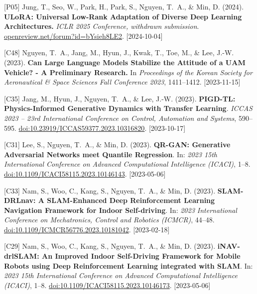 {\begin{pubenumerate}
\item {\color{blue}[P05]} Jung, T., Seo, W., Park, H., Park, S., Nguyen, T.\ A., \& Min, D. (2024). 
  \textbf{ULoRA: Universal Low-Rank Adaptation of Diverse Deep Learning Architectures.} 
  \textit{ICLR 2025 Conference, withdrawn submission}. 
  \href{https://openreview.net/forum?id=bYsieh8LE2}{openreview.net/forum?id=bYsieh8LE2}. [2024-10-04]

\item {\color{green}[C48]} Nguyen, T.\ A., Jang, M., Hyun, J., Kwak, T., Toe, M., \& Lee, J.-W. (2023). 
  \textbf{Can Large Language Models Stabilize the Attitude of a UAM Vehicle? - A Preliminary Research.} 
  In \textit{Proceedings of the Korean Society for Aeronautical \& Space Sciences Fall Conference 2023}, 1411--1412. [2023-11-15]

\item {\color{green}[C35]} Jang, M., Hyun, J., Nguyen, T.\ A., \& Lee, J.-W. (2023). \textbf{PIGD-TL: Physics-Informed Generative Dynamics with Transfer Learning}. \textit{ICCAS 2023 -- 23rd International Conference on Control, Automation and Systems}, 590--595. \href{https://doi.org/10.23919/ICCAS59377.2023.10316820}{doi:10.23919/ICCAS59377.2023.10316820}. [2023-10-17]

\item {\color{green}[C31]} Lee, S., Nguyen, T.\ A., \& Min, D. (2023). \textbf{QR-GAN: Generative Adversarial Networks meet Quantile Regression}. In: \textit{2023 15th International Conference on Advanced Computational Intelligence (ICACI)}, 1--8. \href{https://doi.org/10.1109/ICACI58115.2023.10146143}{doi:10.1109/ICACI58115.2023.10146143}. [2023-05-06]

\item {\color{green}[C33]} Nam, S., Woo, C., Kang, S., Nguyen, T.\ A., \& Min, D. (2023). \textbf{SLAM-DRLnav: A SLAM-Enhanced Deep Reinforcement Learning Navigation Framework for Indoor Self-driving}. In: \textit{2023 International Conference on Mechatronics, Control and Robotics (ICMCR)}, 44--48. \href{https://doi.org/10.1109/ICMCR56776.2023.10181042}{doi:10.1109/ICMCR56776.2023.10181042}. [2023-02-18]

\item {\color{green}[C29]} Nam, S., Woo, C., Kang, S., Nguyen, T.\ A., \& Min, D. (2023). \textbf{iNAV-drlSLAM: An Improved Indoor Self-Driving Framework for Mobile Robots using Deep Reinforcement Learning integrated with SLAM}. In: \textit{2023 15th International Conference on Advanced Computational Intelligence (ICACI)}, 1--8. \href{https://doi.org/10.1109/ICACI58115.2023.10146173}{doi:10.1109/ICACI58115.2023.10146173}. [2023-05-06]


\end{pubenumerate}}
